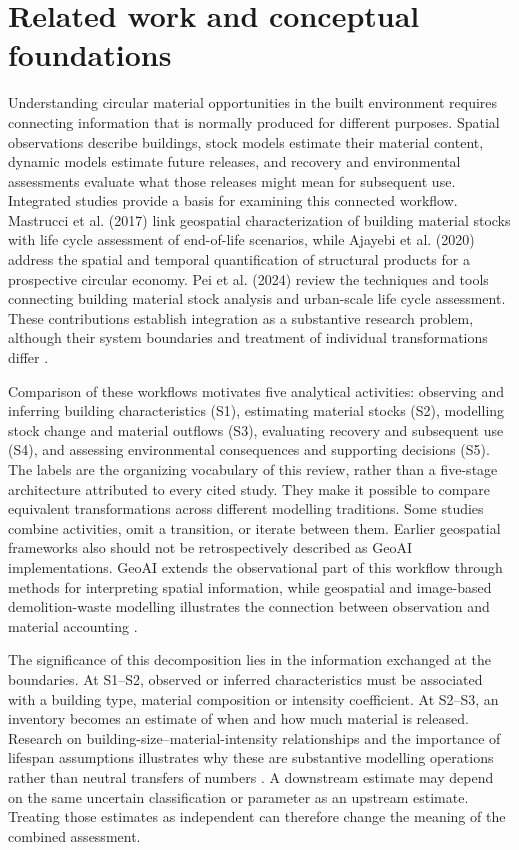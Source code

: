 \section{Related work and conceptual foundations}

Understanding circular material opportunities in the built environment requires connecting information that is normally produced for different purposes. Spatial observations describe buildings, stock models estimate their material content, dynamic models estimate future releases, and recovery and environmental assessments evaluate what those releases might mean for subsequent use. Integrated studies provide a basis for examining this connected workflow. Mastrucci et al. (2017) link geospatial characterization of building material stocks with life cycle assessment of end-of-life scenarios, while Ajayebi et al. (2020) address the spatial and temporal quantification of structural products for a prospective circular economy. Pei et al. (2024) review the techniques and tools connecting building material stock analysis and urban-scale life cycle assessment. These contributions establish integration as a substantive research problem, although their system boundaries and treatment of individual transformations differ \citep{I36,I37,I35}.

Comparison of these workflows motivates five analytical activities: observing and inferring building characteristics (S1), estimating material stocks (S2), modelling stock change and material outflows (S3), evaluating recovery and subsequent use (S4), and assessing environmental consequences and supporting decisions (S5). The labels are the organizing vocabulary of this review, rather than a five-stage architecture attributed to every cited study. They make it possible to compare equivalent transformations across different modelling traditions. Some studies combine activities, omit a transition, or iterate between them. Earlier geospatial frameworks also should not be retrospectively described as GeoAI implementations. GeoAI extends the observational part of this workflow through methods for interpreting spatial information, while geospatial and image-based demolition-waste modelling illustrates the connection between observation and material accounting \citep{I08,U01}.

The significance of this decomposition lies in the information exchanged at the boundaries. At S1--S2, observed or inferred characteristics must be associated with a building type, material composition or intensity coefficient. At S2--S3, an inventory becomes an estimate of when and how much material is released. Research on building-size--material-intensity relationships and the importance of lifespan assumptions illustrates why these are substantive modelling operations rather than neutral transfers of numbers \citep{I13,U11}. A downstream estimate may depend on the same uncertain classification or parameter as an upstream estimate. Treating those estimates as independent can therefore change the meaning of the combined assessment.

